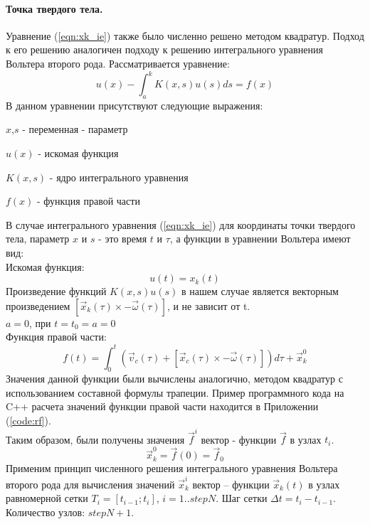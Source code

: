 \documentclass[12pt,a4paper]{article}
\begin{document}
\paragraph{Точка твердого тела.}
Уравнение (\ref{eqn:xk_ie}) также было численно решено методом квадратур. Подход к его решению аналогичен подходу к решению интегрального уравнения Вольтера второго рода. Рассматривается уравнение:
\begin{equation}
\label{eqn:Volter2}
u(x)-\int_{a}^{k} K(x,s)u(s)ds=f(x)
\end{equation}
В данном уравнении присутствуют следующие выражения:
\begin{list}{}{}
\item $x$,$s$ - переменная - параметр
\item $u(x)$ - искомая функция
\item $K(x,s)$ - ядро интегрального уравнения
\item $f(x)$ - функция правой части
\end{list}
В случае интегрального уравнения (\ref{eqn:xk_ie}) для координаты точки твердого тела, параметр $x$ и $s$ - это время $t$ и $\tau$, а функции в уравнении Вольтера имеют вид:\\
Искомая функция:
\[
u(t)=x_k(t)
\]
Произведение функций $K(x,s)u(s)$ в нашем случае является векторным произведением $[\overrightarrow{x}_k(\tau)\times-\overrightarrow{\omega}(\tau)]$, и не зависит от t.\\
$a=0$, при $t=t_0=a=0$\\
Функция правой части:\\
\begin{equation}
\label{eqn:rf}
f(t)=\int_{0}^{t}(\overrightarrow{v}_c(\tau)+[\overrightarrow{x}_c(\tau)\times-\overrightarrow{\omega}(\tau)])d\tau+\overrightarrow{x}_k^0
\end{equation}
Значения данной функции были вычислены аналогично, методом квадратур с использованием составной формулы трапеции. Пример программного кода на C++ расчета значений функции правой части находится в Приложении (\ref{code:rf}).\\
Таким образом, были получены значения                                 $\overrightarrow{f}^i$ вектор - функции $\overrightarrow{f}$ в узлах $t_i$.\\
\[
\overrightarrow{x}_k^0=\overrightarrow{f}(0)=\overrightarrow{f}_0
\]
Применим принцип численного решения интегрального уравнения Вольтера второго рода для вычисления значений $\overrightarrow{x}_k^i$ вектор – функции $\overrightarrow{x}_k(t)$ в узлах равномерной сетки $T_i=[t_{i-1}; t_i]$, $i=1..stepN$. Шаг сетки $\Delta t= t_i-t_{i-1}$. Количество узлов: $stepN+1$.\\
\end{document}
